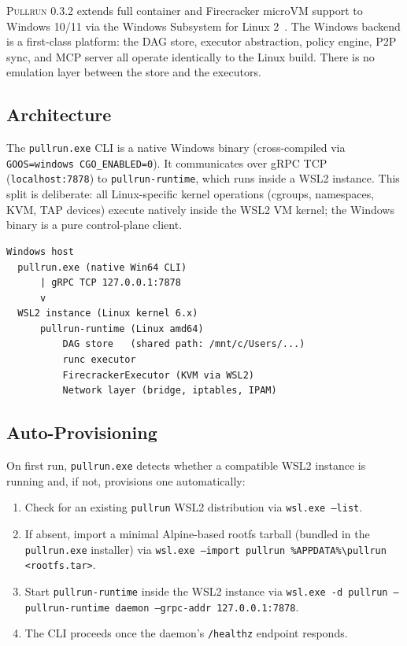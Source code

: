\documentclass[11pt,a4paper]{article}
\newcommand{\pullrun}{\textsc{Pullrun}}
\begin{document}
\pullrun{} 0.3.2 extends full container and Firecracker microVM support to Windows 10/11 via the Windows Subsystem for Linux 2~\cite{wsl2}. The Windows backend is a first-class platform: the DAG store, executor abstraction, policy engine, P2P sync, and MCP server all operate identically to the Linux build. There is no emulation layer between the store and the executors.

\subsection{Architecture}

The \texttt{pullrun.exe} CLI is a native Windows binary (cross-compiled via \texttt{GOOS=windows CGO\_ENABLED=0}). It communicates over gRPC TCP (\texttt{localhost:7878}) to \texttt{pullrun-runtime}, which runs inside a WSL2 instance. This split is deliberate: all Linux-specific kernel operations (cgroups, namespaces, KVM, TAP devices) execute natively inside the WSL2 VM kernel; the Windows binary is a pure control-plane client.

\begin{verbatim}
Windows host
  pullrun.exe (native Win64 CLI)
      | gRPC TCP 127.0.0.1:7878
      v
  WSL2 instance (Linux kernel 6.x)
      pullrun-runtime (Linux amd64)
          DAG store   (shared path: /mnt/c/Users/...)
          runc executor
          FirecrackerExecutor (KVM via WSL2)
          Network layer (bridge, iptables, IPAM)
\end{verbatim}

\subsection{Auto-Provisioning}

On first run, \texttt{pullrun.exe} detects whether a compatible WSL2 instance is running and, if not, provisions one automatically:

\begin{enumerate}[leftmargin=*]
    \item Check for an existing \texttt{pullrun} WSL2 distribution via \texttt{wsl.exe --list}.
    \item If absent, import a minimal Alpine-based rootfs tarball (bundled in the \texttt{pullrun.exe} installer) via \texttt{wsl.exe --import pullrun \%APPDATA\%\textbackslash{}pullrun <rootfs.tar>}.
    \item Start \texttt{pullrun-runtime} inside the WSL2 instance via \texttt{wsl.exe -d pullrun -- pullrun-runtime daemon --grpc-addr 127.0.0.1:7878}.
    \item The CLI proceeds once the daemon's \texttt{/healthz} endpoint responds.
\end{enumerate}
\end{document}
